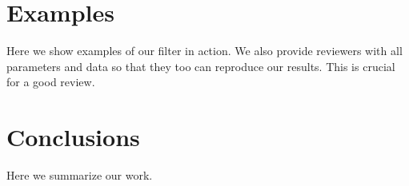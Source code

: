 \documentclass{InsightArticle}
\begin{document}
\section{Examples}

Here we show examples of our filter in action.  We also provide
reviewers with all parameters and data so that they too can
reproduce our results.  This is crucial for a good review.


\section{Conclusions}

Here we summarize our work.





%
%
%
%
%
%
%
%


%
%

\end{document}
